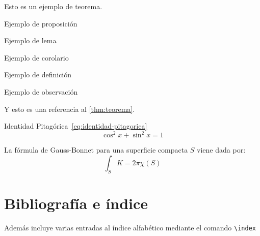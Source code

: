 \begin{teorema}\label{thm:teorema}
Esto es un ejemplo de teorema.
\end{teorema}

\begin{proposicion}
Ejemplo de proposición
\end{proposicion}

\begin{lema}
Ejemplo de lema
\end{lema}

\begin{corolario}
Ejemplo de corolario
\end{corolario}

\begin{definicion}
Ejemplo de definición
\end{definicion}

\begin{observacion}
Ejemplo de observación
\end{observacion}

Y esto es una referencia al \autoref{thm:teorema}. 

Identidad Pitagórica~\eqref{eq:identidad-pitagorica}
\begin{equation}\label{eq:identidad-pitagorica}
  \cos^2 x + \sin^2 x = 1
\end{equation}

La fórmula de Gauss-Bonnet para una superficie compacta $S$ viene dada por:
\begin{equation}
  \int_S K = 2\pi\chi(S)
\end{equation}


\section{Bibliografía e índice}

Además incluye varias entradas al índice alfabético mediante el comando \verb+\index+ 


\endinput
